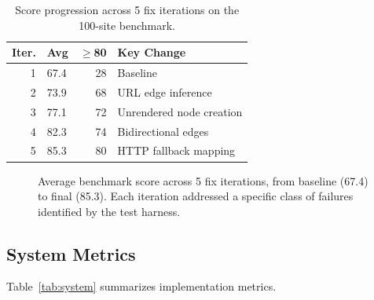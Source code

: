 \documentclass[10pt, twocolumn]{article}
\begin{document}
\begin{table}[t]
\caption{Score progression across 5 fix iterations on the 100-site benchmark.}
\label{tab:progression}
\centering
\small
\begin{tabular}{@{}rlrl@{}}
\toprule
\textbf{Iter.} & \textbf{Avg} & \textbf{$\geq$80} & \textbf{Key Change} \\
\midrule
1 & 67.4 & 28 & Baseline \\
2 & 73.9 & 68 & URL edge inference \\
3 & 77.1 & 72 & Unrendered node creation \\
4 & 82.3 & 74 & Bidirectional edges \\
5 & 85.3 & 80 & HTTP fallback mapping \\
\bottomrule
\end{tabular}
\end{table}

\begin{figure}[t]
\centering
{}
\caption{Average benchmark score across 5 fix iterations, from baseline (67.4) to final (85.3). Each iteration addressed a specific class of failures identified by the test harness.}
\label{fig:progression}
\end{figure}


\subsection{System Metrics}

Table~\ref{tab:system} summarizes implementation metrics.
\end{document}
